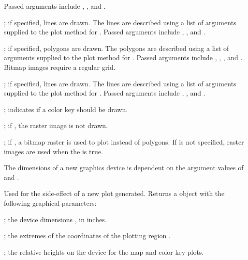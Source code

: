 \documentclass[a4paper]{book}
\begin{document}
\begin{Arguments}
\begin{ldescription}
Passed arguments include , , and .
\item[\code{rivers}] ; if specified, lines are drawn.
The lines are described using a list of arguments supplied to the plot method for .
Passed arguments include , , and .
\item[\code{lakes}] ; if specified, polygons are drawn.
The polygons are described using a list of arguments supplied to the plot method for .
Passed arguments include , , , and .
Bitmap images require a regular grid.
\item[\code{roads}] ; if specified, lines are drawn.
The lines are described using a list of arguments supplied to the plot method for .
Passed arguments include , , and .
\item[\code{draw.key}] ; indicates if a color key should be drawn.
\item[\code{draw.raster}] ; if , the raster image is not drawn.
\item[\code{useRaster}] ; if , a bitmap raster is used to plot  instead of polygons.
If  is not specified, raster images are used when the  is true.
\end{ldescription}
\end{Arguments}
%
\begin{Details}\relax
The dimensions of a new graphics device is dependent on the argument values of  and .
\end{Details}
%
\begin{Value}
Used for the side-effect of a new plot generated.
Returns a  object with the following graphical parameters:
\begin{ldescription}
\item[\code{din}] ; the device dimensions , in inches.
\item[\code{usr}] ; the extremes of the coordinates of the plotting region .
\item[\code{heights}] ; the relative heights on the device  for the map and color-key plots.
\end{ldescription}
\end{Value}
\end{document}
